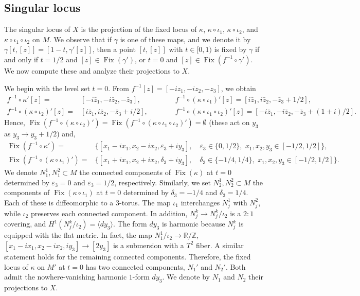 \documentclass[10pt]{article}
\newcommand{\e}{\varepsilon}
\newcommand{\R}{\mathbb R}
\newcommand{\Z}{\mathbb Z}
\newcommand{\la}{\langle}
\newcommand{\ra}{\rangle}
\newcommand{\Fix}{\operatorname{Fix}}
\theoremstyle{plain}
\theoremstyle{definition}
\theoremstyle{remark}
\begin{document}
\subsection{Singular locus} \label{sec:sing}
The singular locus of $X$ is the projection of the fixed locus of $\kappa$, $\kappa \circ \iota_1$, $\kappa \circ \iota_2$, and $\kappa \circ \iota_1\circ \iota_2$ on $M$.  We observe that if $\gamma$ is one of these maps, and we denote it by $\gamma[t,[z]]=[1-t,\gamma' [z]]$, then a point $[t,[z]]$ with $t\in [0,1)$ is fixed by $\gamma$ if and only if $t=1/2$ and $[z]\in \Fix(\gamma')$, or $t=0$ and $[z]\in \Fix(f^{-1}\circ \gamma')$.
We now compute these and analyze their projections to $X$. 

We begin with the level set $t=0$. From $f^{-1}[z]=[-iz_1,-iz_2,-z_3]$, we obtain
\begin{align*}
f^{-1}\circ \kappa' [z]=&[-i\bar{z}_1,-i\bar{z}_2,-\bar{z}_3], \qquad \qquad 
&f^{-1}\circ (\kappa\circ \iota_1)' [z]=[i\bar{z}_1,i\bar{z}_2,-\bar{z}_3 + 1/2], \\
f^{-1}\circ (\kappa\circ \iota_2)' [z]=&[i\bar{z}_1,i\bar{z}_2,-\bar{z}_3 + i/2], \qquad 
&f^{-1}\circ (\kappa\circ \iota_1 \circ \iota_2)' [z]= [-i\bar{z}_1,-i\bar{z}_2,-\bar{z}_3 + (1+i)/2].
\end{align*}
Hence, $\Fix(f^{-1}\circ (\kappa \circ \iota_2)')=\Fix(f^{-1}\circ (\kappa \circ \iota_1\circ \iota_2)')=\emptyset$ (these act on $y_3$ as $y_3 \to y_3 + 1/2$) and,
\begin{align}
\Fix(f^{-1}\circ \kappa')=&\{ [x_1-ix_1, x_2-ix_2, \e_3 + iy_3],\quad \e_3 \in \{0,1/2\}, \,\, x_1,x_2,y_3\in [-1/2,1/2] \} , \label{eqn:N1} \\
\Fix(f^{-1}\circ (\kappa\circ \iota_1)')=&\{ [x_1+ix_1, x_2+ix_2, \delta_3 + iy_3], \quad \delta_3 \in \{-1/4,1/4\}, \,\,  x_1,x_2,y_3\in [-1/2,1/2] \}. \label{eqn:N2}
\end{align}
We denote $N_1^1, N_1^2 \subset M$ the  connected components of $\Fix(\kappa)$ at $t=0$ determined by $\e_3=0$ and $\e_3=1/2$, respectively. Similarly, we set $N_2^1,N_2^2\subset M$ the components of $\Fix(\kappa \circ \iota_1)$ at $t=0$ determined by $\delta_3=-1/4$ and $\delta_3=1/4$. Each of these is diffeomorphic to a $3$-torus. The map $\iota_1$
interchanges $N_j^1$ with $N_j^2$, while $\iota_2$
preserves each connected component.
In addition, $N_j^k \to N_j^k/\iota_2$ is a $2:1$ covering, and $H^1(N_j^k/\iota_2)=\la dy_3\ra$. The form $dy_3$ is harmonic because $N_j^k$ is equipped with the flat metric.
In fact, the map $N_1^1/\iota_2 \to \R/\Z$, $[x_1-ix_1,x_2-ix_2,iy_3]\to [2y_3]$ is a submersion with a $T^2$ fiber. A similar statement holds for the remaining connected components. Therefore, the fixed locus of $\kappa$ on $M'$ at $t=0$ has two connected components, $N_1'$ and $N_2'$. Both admit the nowhere-vanishing  harmonic $1$-form $dy_3$. We denote by $N_1$ and $N_2$ their projections to $X$.
\end{document}
